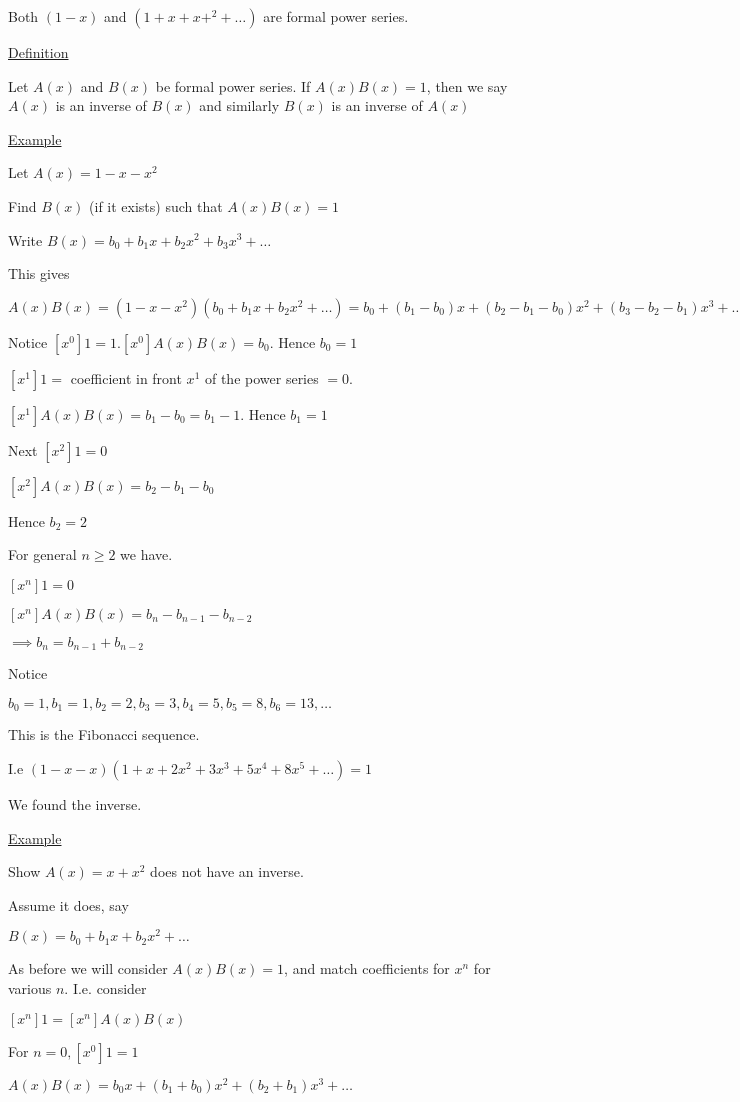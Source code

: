 \documentclass{article}
\begin{document}
Both $(1-x)$ and $(1+x+x+^2+\ldots)$ are formal power series. 

\underline{Definition}

Let $A(x)$ and $B(x)$ be formal power series. If $A(x)B(x)=1$, then we say $A(x)$ is an inverse of $B(x)$ and similarly $B(x)$ is an inverse of $A(x)$

\underline{Example} 

Let $A(x) = 1-x-x^2$

Find $B(x)$ (if it exists) such that $A(x)B(x)=1$

Write $B(x) = b_0 + b_1x + b_2x^2 + b_3x^3 + \ldots$

This gives

$A(x)B(x) = (1-x-x^2)(b_0+b_1x+b_2x^2+\ldots) = b_0 + (b_1 - b_0)x + (b_2 - b_1 - b_0)x^2 + (b_3 - b_2 - b_1) x^3 + \ldots$

Notice $[x^0]1 = 1. [x^0]A(x)B(x)=b_0$. Hence $b_0 = 1$

$[x^1]1=$ coefficient in front $x^1$ of the power series $= 0$.

$[x^1]A(x)B(x)=b_1-b_0 = b_1-1$. Hence $b_1 = 1$

Next $[x^2]1 = 0$

$[x^2]A(x)B(x) = b_2-b_1-b_0$

Hence $b_2 = 2$

For general $n \ge 2$ we have.

$[x^n]1=0$

$[x^n]A(x)B(x) = b_n - b_{n-1}-b_{n-2}$

$\implies b_n = b_{n-1} + b_{n-2}$

Notice

$b_0=1, b_1=1,b_2=2, b_3=3, b_4=5, b_5=8, b_6=13,\ldots$

This is the Fibonacci sequence. 

I.e $(1-x-x)(1+x+2x^2+3x^3+5x^4+8x^5+\ldots) = 1$

We found the inverse.

\underline{Example}

Show $A(x)=x+x^2$ does not have an inverse.

Assume it does, say

$B(x)=b_0+b_1x+b_2x^2+\ldots$

As before we will consider $A(x)B(x)=1$, and match coefficients for $x^n$ for various $n$. I.e. consider

$[x^n]1 = [x^n]A(x)B(x)$

For $n=0, [x^0]1=1$

$A(x)B(x) = b_0x + (b_1 + b_0)x^2 + (b_2+b_1)x^3+\ldots$
\end{document}
